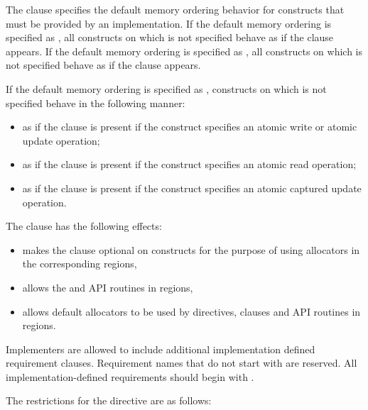 The  clause specifies the default memory ordering
behavior for  constructs that must be provided by an
implementation. If the default memory ordering is specified as , all
 constructs on which  is not specified
behave as if the  clause appears. If the default memory
ordering is specified as , all  constructs on which
 is not specified behave as if the 
clause appears.

If the default memory ordering is specified as , 
constructs on which  is not specified behave in the
following manner:

\begin{itemize}
    \item as if the  clause is present if the construct
        specifies an atomic write or atomic update operation;
    \item as if the  clause is present if the construct
        specifies an atomic read operation;
    \item as if the  clause is present if the construct
        specifies an atomic captured update operation.
\end{itemize}

The  clause has the following effects:
\begin{itemize}
 \item makes the  clause optional on  constructs for the purpose of using allocators in the corresponding  regions,
 \item allows the  and  API routines in  regions,
 \item allows default allocators to be used by  directives,  clauses and  API routines in  regions.
\end{itemize}

Implementers are allowed to include additional implementation defined
requirement clauses.  Requirement names that do not start with  are
reserved. All implementation-defined requirements should begin with
.

\restrictions

The restrictions for the  directive are as follows:

